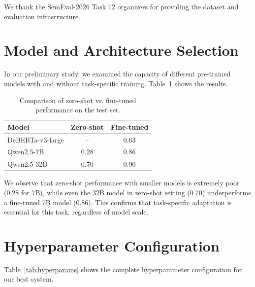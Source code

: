 \documentclass[11pt]{article}
\begin{document}
We thank the SemEval-2026 Task 12 organizers for providing the dataset and evaluation infrastructure.


% 

\appendix

\section{Model and Architecture Selection}
\label{app:architecture}

In our preliminary study, we examined the capacity of different pre-trained models with and without task-specific training. Table~\ref{tab:model_selection} shows the results.

\begin{table}[h]
\centering
\small
\begin{tabular}{lcc}
\toprule
\textbf{Model} & \textbf{Zero-shot} & \textbf{Fine-tuned} \\
\midrule
DeBERTa-v3-large & -- & 0.63 \\
Qwen2.5-7B & 0.28 & 0.86 \\
Qwen2.5-32B & 0.70 & 0.90 \\
\bottomrule
\end{tabular}
\caption{Comparison of zero-shot vs. fine-tuned performance on the test set.}
\label{tab:model_selection}
\end{table}

We observe that zero-shot performance with smaller models is extremely poor (0.28 for 7B), while even the 32B model in zero-shot setting (0.70) underperforms a fine-tuned 7B model (0.86). This confirms that task-specific adaptation is essential for this task, regardless of model scale.

\section{Hyperparameter Configuration}
\label{app:hyperparams}

Table~\ref{tab:hyperparams} shows the complete hyperparameter configuration for our best system.
\end{document}
